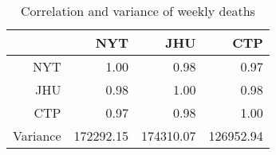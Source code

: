 \begin{table}[ht]
\centering
\begin{tabular}{rrrr}
  \hline
 & NYT & JHU & CTP \\ 
  \hline
NYT & 1.00 & 0.98 & 0.97 \\ 
  JHU & 0.98 & 1.00 & 0.98 \\ 
  CTP & 0.97 & 0.98 & 1.00 \\ 
  Variance & 172292.15 & 174310.07 & 126952.94 \\ 
   \hline
\end{tabular}
\caption{Correlation and variance of weekly deaths\label{tab:weekdeathcor}} 
\end{table}
